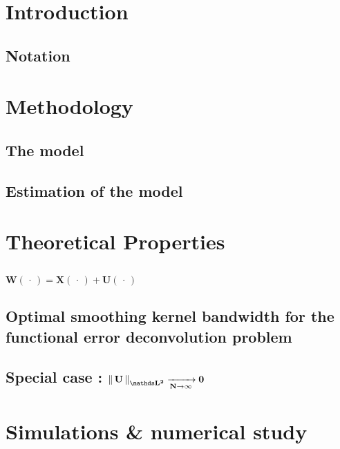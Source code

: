 \linespread{1.2}\selectfont

\section{Introduction}

\subsection{Notation}



\section{Methodology}

\subsection{The model}

\subsection{Estimation of the model}

\section{Theoretical Properties}

\subsection{}

$\mathbf{W( \,\cdot\, ) = X( \,\cdot\, ) + U( \,\cdot\, )}$

\subsection{Optimal smoothing kernel bandwidth for the functional error deconvolution problem}

\subsection[Special case of increasing error's L2 norm]{Special case : $\mathbf{\norme {\mathds L^2} U \tend N \infty 0 }$}


\section{Simulations \& numerical study}